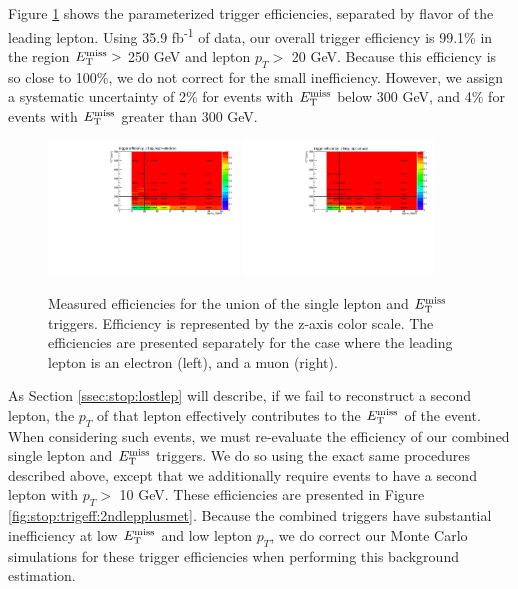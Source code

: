 Figure \ref{fig:stop:trigeff:1lepmet} shows the parameterized trigger
efficiencies, separated by flavor of the leading lepton. Using 35.9 fb\textsuperscript{-1}
of data, our overall trigger efficiency is 99.1\% in the region $E_\text{T}^\text{miss} >$
250 GeV and lepton $p_T >$ 20 GeV. Because this efficiency is so close
to 100\%, we do not correct for the small inefficiency. However, we
assign a systematic uncertainty of 2\% for events with $E_\text{T}^\text{miss}$ below 300
GeV, and 4\% for events with $E_\text{T}^\text{miss}$ greater than 300 GeV.

\begin{figure}[htb]
\centering
\includegraphics[width=0.45\textwidth]{figures/TriggerEff_el.pdf}
\includegraphics[width=0.45\textwidth]{figures/TriggerEff_mu.pdf}
\caption{Measured efficiencies for the union of the single lepton and
  $E_\text{T}^\text{miss}$ triggers. Efficiency is represented by the z-axis color scale. The
  efficiencies are presented separately for the case where the leading
  lepton is an electron (left), and a muon (right).}
\label{fig:stop:trigeff:1lepmet}
\end{figure}

As Section \ref{ssec:stop:lostlep} will describe, if we fail to
reconstruct a second lepton, the $p_T$ of that lepton effectively
contributes to the $E_\text{T}^\text{miss}$ of the event. When considering such events, we must
re-evaluate the efficiency of our combined single lepton and $E_\text{T}^\text{miss}$
triggers. We do so using the exact same procedures described above,
except that we additionally require events to have a second lepton
with $p_T >$ 10 GeV. These efficiencies are presented in Figure
\ref{fig:stop:trigeff:2ndlepplusmet}. Because the combined triggers
have substantial inefficiency at low $E_\text{T}^\text{miss}$ and low lepton $p_T$, we
do correct our Monte Carlo simulations for these trigger
efficiencies when performing this background estimation.

